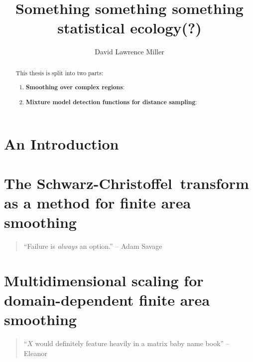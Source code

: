 \documentclass[mitthesis]{report}
\title{Something something something statistical ecology(?)}
\author{David Lawrence Miller}
\newcommand{\sch}{Schwarz-Christoffel}
\begin{document}
\maketitle
\begin{abstract} 
This thesis is split into two parts:
\begin{enumerate}
	\item \textbf{Smoothing over complex regions}:
	\item \textbf{Mixture model detection functions for distance sampling}:
\end{enumerate}
\end{abstract}



\tableofcontents

\listoffigures

\chapter{An Introduction}



\chapter{The \sch\ transform as a method for finite area smoothing}
\begin{quotation}
``Failure is \textit{always} an option.'' -- Adam Savage
\end{quotation}



\chapter{Multidimensional scaling for domain-dependent finite area smoothing}
\begin{quotation}
``$X$ would definitely feature heavily in a matrix baby name book'' -- Eleanor
\end{quotation}


\end{document}
